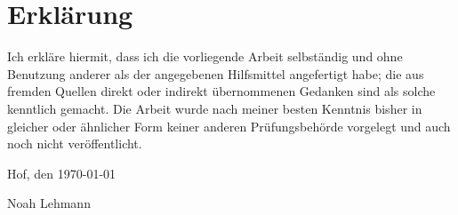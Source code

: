 \clearpage
{}
\pagestyle{empty}

\section*{Erklärung}

\vspace*{2cm}

\noindent Ich erkläre hiermit, dass ich die vorliegende Arbeit selbständig und ohne Benutzung
anderer als der angegebenen Hilfsmittel angefertigt habe; die aus fremden Quellen
direkt oder indirekt übernommenen Gedanken sind als solche kenntlich gemacht.
Die Arbeit wurde nach meiner besten Kenntnis bisher in gleicher oder ähnlicher Form
keiner anderen Prüfungsbehörde vorgelegt und auch noch nicht veröffentlicht.

\vspace*{5cm}

\noindent Hof, den \today

\vspace*{3cm}

\noindent Noah Lehmann

\restoregeometry
